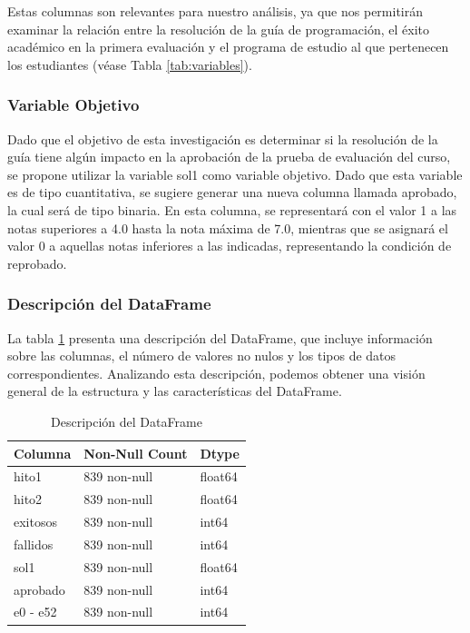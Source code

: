 Estas columnas son relevantes para nuestro análisis, ya que nos permitirán examinar la relación
entre la resolución de la guía de programación, el éxito académico en la primera evaluación y
el programa de estudio al que pertenecen los estudiantes (véase Tabla \ref{tab:variables}).

\subsubsection{Variable Objetivo}

Dado que el objetivo de esta investigación es determinar si la resolución de la guía tiene algún impacto en la aprobación de la prueba de evaluación del curso, se propone utilizar la variable sol1 como variable objetivo. Dado que esta variable es de tipo cuantitativa, se sugiere generar una nueva columna llamada aprobado, la cual será de tipo binaria. En esta columna, se representará con el valor 1 a las notas superiores a 4.0 hasta la nota máxima de 7.0, mientras que se asignará el valor 0 a aquellas notas inferiores a las indicadas, representando la condición de reprobado.

\subsubsection{Descripción del DataFrame}

La tabla \ref{tab:descripcion_dataframe} presenta una descripción del DataFrame, que incluye información sobre las columnas, el número de valores no nulos y los tipos de datos correspondientes. Analizando esta descripción, podemos obtener una visión general de la estructura y las características del DataFrame.

\begin{table}[H]
    \centering
    \caption{Descripción del DataFrame}
    \begin{tabular}{lll}
        \hline
        \textbf{Columna} & \textbf{Non-Null Count} & \textbf{Dtype} \\
        \hline
        hito1            & 839 non-null            & float64        \\
        hito2            & 839 non-null            & float64        \\
        exitosos         & 839 non-null            & int64          \\
        fallidos         & 839 non-null            & int64          \\
        sol1             & 839 non-null            & float64        \\
        aprobado         & 839 non-null            & int64          \\
        e0 - e52         & 839 non-null            & int64          \\
        \hline
    \end{tabular}%
    \label{tab:descripcion_dataframe}%
\end{table}%

